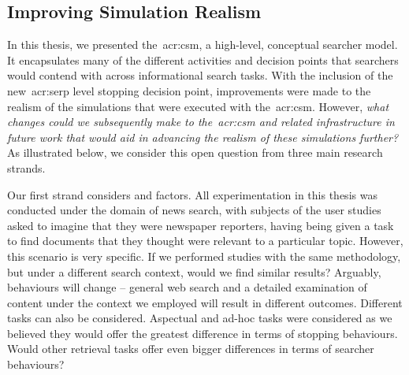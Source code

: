 \subsection{Improving Simulation Realism}\label{sec:conclusions:future:improving}
In this thesis, we presented the~\gls{acr:csm}, a high-level, conceptual searcher model. It encapsulates many of the different activities and decision points that searchers would contend with across informational search tasks. With the inclusion of the new~\gls{acr:serp} level stopping decision point, improvements were made to the realism of the simulations that were executed with the~\gls{acr:csm}. However, \emph{what changes could we subsequently make to the~\gls{acr:csm} and related infrastructure in future work that would aid in advancing the realism of these simulations further?} As illustrated below, we consider this open question from three main research strands.

\begin{figure}[h!]
    \centering
\end{figure}

Our first strand considers  and  factors. All experimentation in this thesis was conducted under the domain of news search, with subjects of the user studies asked to imagine that they were newspaper reporters, having being given a task to find documents that they thought were relevant to a particular topic. However, this scenario is very specific. If we performed studies with the same methodology, but under a different search context, would we find similar results? Arguably, behaviours will change -- general web search and a detailed examination of content under the context we employed will result in different outcomes. Different tasks can also be considered. Aspectual and ad-hoc tasks were considered as we believed they would offer the greatest difference in terms of stopping behaviours. Would other retrieval tasks offer even bigger differences in terms of searcher behaviours?

